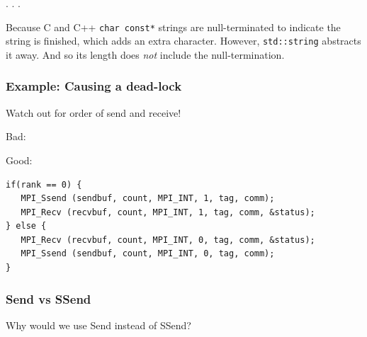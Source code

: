 . . .

Because C and C++ \texttt{char const*} strings are null-terminated to
indicate the string is finished, which adds an extra character. However,
\texttt{std::string} abstracts it away. And so its length does
\emph{not} include the null-termination.

\subsubsection{Example: Causing a
dead-lock}\label{example-causing-a-dead-lock}

Watch out for order of send and receive!

Bad:

\begin{Shaded}
\begin{Highlighting}[]
\NormalTok{) \{}
\NormalTok{\} } \NormalTok{\{}
\NormalTok{\}}
\end{Highlighting}
\end{Shaded}

Good:

\begin{verbatim}
if(rank == 0) {
   MPI_Ssend (sendbuf, count, MPI_INT, 1, tag, comm);
   MPI_Recv (recvbuf, count, MPI_INT, 1, tag, comm, &status);
} else {
   MPI_Recv (recvbuf, count, MPI_INT, 0, tag, comm, &status);
   MPI_Ssend (sendbuf, count, MPI_INT, 0, tag, comm);
}
\end{verbatim}

\subsubsection{Send vs SSend}\label{send-vs-ssend}

Why would we use Send instead of SSend?

